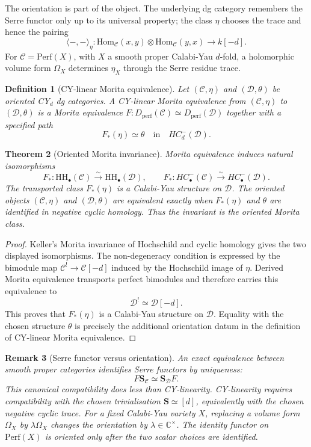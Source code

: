 \documentclass[11pt]{amsart}
\newtheorem{theorem}{Theorem}[section]
\newtheorem{definition}[theorem]{Definition}
\newtheorem{remark}[theorem]{Remark}
\newcommand{\HH}{\mathrm{HH}}
\newcommand{\Perf}{\mathrm{Perf}}
\newcommand{\Dperf}{D_{\mathrm{perf}}}
\newcommand{\Hom}{\mathrm{Hom}}
\newcommand{\Ser}{\mathbf{S}}
\newcommand{\cC}{\mathcal{C}}
\newcommand{\cD}{\mathcal{D}}
\newcommand{\bC}{\mathbb{C}}
\begin{document}
The orientation is part of the object.  The underlying dg category
remembers the Serre functor only up to its universal property; the class
$\eta$ chooses the trace and hence the pairing
\[
  \langle-,-\rangle_\eta\colon
  \Hom_\cC(x,y)\otimes\Hom_\cC(y,x)\longrightarrow k[-d].
\]
For $\cC=\Perf(X)$, with $X$ a smooth proper Calabi-Yau $d$-fold, a
holomorphic volume form $\Omega_X$ determines $\eta_X$ through the
Serre residue trace.

\begin{definition}[CY-linear Morita equivalence]
Let $(\cC,\eta)$ and $(\cD,\theta)$ be oriented CY$_d$ dg categories.
A CY-linear Morita equivalence from $(\cC,\eta)$ to $(\cD,\theta)$ is a
Morita equivalence $F\colon\Dperf(\cC)\simeq\Dperf(\cD)$ together with
a specified path
\[
  F_*(\eta)\simeq \theta
  \quad\text{in}\quad HC^-_d(\cD).
\]
\end{definition}

\begin{theorem}[Oriented Morita invariance]
\label{thm:oriented-morita-invariance}
Morita equivalence induces natural isomorphisms
\[
  F_* \colon \HH_\bullet(\cC)\xrightarrow{\sim}\HH_\bullet(\cD),
  \qquad
  F_* \colon HC^-_\bullet(\cC)\xrightarrow{\sim}HC^-_\bullet(\cD).
\]
The transported class $F_*(\eta)$ is a Calabi-Yau structure on $\cD$.
The oriented objects $(\cC,\eta)$ and $(\cD,\theta)$ are equivalent
exactly when $F_*(\eta)$ and $\theta$ are identified in negative cyclic
homology.  Thus the invariant is the oriented Morita class.
\end{theorem}

\begin{proof}
Keller's Morita invariance of Hochschild and cyclic homology gives the
two displayed isomorphisms.  The non-degeneracy condition is expressed
by the bimodule map $\cC^{!}\to\cC[-d]$ induced by the Hochschild image of
$\eta$.  Derived Morita equivalence transports perfect bimodules and
therefore carries this equivalence to
\[
  \cD^{!} \simeq \cD[-d].
\]
This proves that $F_*(\eta)$ is a Calabi-Yau structure on $\cD$.
Equality with the chosen structure $\theta$ is precisely the additional
orientation datum in the definition of CY-linear Morita equivalence.
\end{proof}

\begin{remark}[Serre functor versus orientation]
An exact equivalence between smooth proper categories identifies Serre
functors by uniqueness:
\[
  F\Ser_\cC\simeq\Ser_\cD F.
\]
This canonical compatibility does less than CY-linearity.  CY-linearity
requires compatibility with the chosen trivialisation
$\Ser\simeq[d]$, equivalently with the chosen negative cyclic trace.
For a fixed Calabi-Yau variety $X$, replacing a volume form
$\Omega_X$ by $\lambda\Omega_X$ changes the orientation by
$\lambda\in\bC^\times$.  The identity functor on $\Perf(X)$ is
oriented only after the two scalar choices are identified.
\end{remark}
\end{document}
